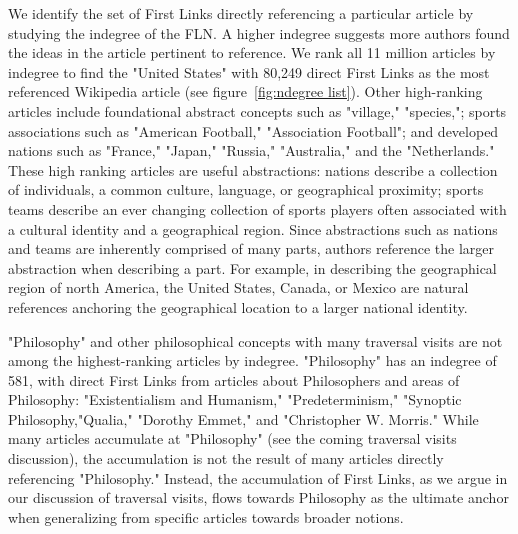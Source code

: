 \documentclass[pre,twocolumn,twoside,superscriptaddress,floatfix, aps, 10pt]{revtex4-1}
\begin{document}
We identify the set of First Links directly referencing a particular article 
by studying the indegree of the FLN. 
A higher indegree suggests more authors found the ideas in the article 
pertinent to reference. 
We rank all 11 million articles by indegree to find 
the "United States" with 80,249 direct First Links as the most referenced
Wikipedia article 
(see figure~\ref{fig:ndegree list}). 
Other high-ranking articles
include foundational abstract concepts such as "village," "species,"; 
sports associations such as "American Football," "Association Football"; 
and developed nations such as "France," "Japan," "Russia," "Australia," and 
the "Netherlands." These high ranking articles are useful abstractions: nations
describe a collection of individuals, a common culture, language, or 
geographical proximity; sports teams describe an ever changing collection of 
sports players often associated with a cultural identity and a geographical 
region. Since abstractions such as nations and teams are inherently comprised
of many parts, authors reference the larger abstraction when describing 
a part. For example, in describing the geographical region of north America, 
the United States, Canada, or Mexico are natural references anchoring the 
geographical location to a larger national identity. 

"Philosophy" and other philosophical concepts with many traversal visits
are not among the highest-ranking articles by indegree.
"Philosophy" has an indegree of 581, with direct First Links from articles about Philosophers and areas of Philosophy: "Existentialism and Humanism," "Predeterminism," "Synoptic Philosophy,"Qualia," "Dorothy Emmet," and "Christopher W. Morris."
While many articles accumulate at "Philosophy" (see the coming traversal visits discussion), 
the accumulation is not the 
result of many articles directly referencing "Philosophy." 
Instead, the accumulation of First Links, as we argue in our 
discussion of traversal visits, flows towards Philosophy as the 
ultimate anchor when generalizing from specific articles towards broader notions.
\end{document}
